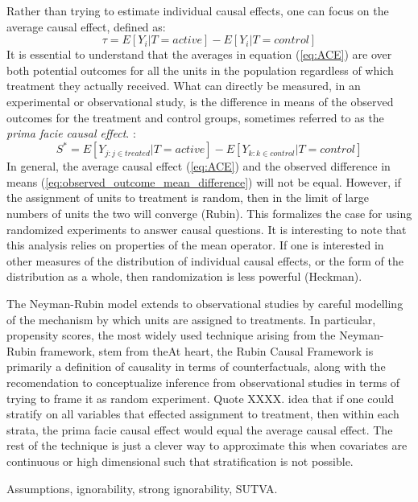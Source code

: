 \documentclass[11pt,a4paper]{article}
\begin{document}
Rather than trying to estimate individual causal effects, one can focus on the average causal effect, defined as:
\begin{equation}
\label{eq:ACE}
\tau = E[Y_{i}|T=active] - E[Y_{i}|T=control]
\end{equation}
It is essential to understand that the averages in equation (\ref{eq:ACE}) are over both potential outcomes for all the units in the population regardless of which treatment they actually received. What can directly be measured, in an experimental or observational study, is the difference in means of the observed outcomes for the treatment and control groups, sometimes referred to as the \textit{prima facie causal effect}. :
\begin{equation}
\label{eq:observed_outcome_mean_difference}
S^{*} = E[Y_{j: j \in treated}|T = active] - E[Y_{k: k \in control}|T = control]
\end{equation}
In general, the average causal effect (\ref{eq:ACE}) and the observed difference in means (\ref{eq:observed_outcome_mean_difference}) will not be equal. However, if the assignment of units to treatment is random, then in the limit of large numbers of units the two will converge (Rubin). This formalizes the case for using randomized experiments to answer causal questions. It is interesting to note that this analysis relies on properties of the mean operator. If one is interested in other measures of the distribution of individual causal effects, or the form of the distribution as a whole, then randomization is less powerful (Heckman).

The Neyman-Rubin model extends to observational studies by careful modelling of the mechanism by which units are assigned to treatments. In particular, propensity scores, the most widely used technique arising from the Neyman-Rubin framework, stem from theAt heart, the Rubin Causal Framework is primarily a definition of causality in terms of counterfactuals, along with the recomendation to conceptualize inference from observational studies in terms of trying to frame it as random experiment. Quote XXXX. idea that if one could stratify on all variables that effected assignment to treatment, then within each strata, the prima facie causal effect would equal the average causal effect. The rest of the technique is just a clever way to approximate this when covariates are continuous or high dimensional such that stratification is not possible.   

Assumptions, ignorability, strong ignorability, SUTVA.
\end{document}
